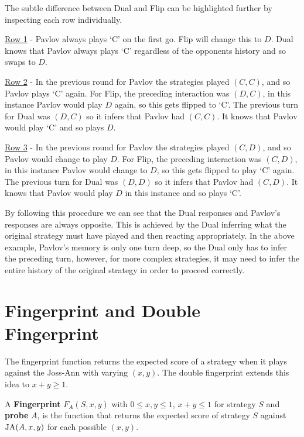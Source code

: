 The subtle difference between Dual and Flip can be highlighted further by inspecting each row individually.

\underline{Row 1} - Pavlov always plays `C' on the first go.
Flip will change this to $D$.
Dual knows that Pavlov always plays `C' regardless of the opponents history and so swaps to $D$.

\underline{Row 2} - In the previous round for Pavlov the strategies played $(C, C)$, and so Pavlov plays `C' again.
For Flip, the preceding interaction was $(D, C)$, in this instance Pavlov would play $D$ again, so this gets flipped to `C'.
The previous turn for Dual was $(D, C)$ so it infers that Pavlov had $(C, C)$.
It knows that Pavlov would play `C' and so plays $D$.

\underline{Row 3} - In the previous round for Pavlov the strategies played $(C, D)$, and so Pavlov would change to play $D$.
For Flip, the preceding interaction was $(C, D)$, in this instance Pavlov would change to $D$, so this gets flipped to play `C' again.
The previous turn for Dual was $(D, D)$ so it infers that Pavlov had $(C, D)$.
It knows that Pavlov would play $D$ in this instance and so plays `C'.

By following this procedure we can see that the Dual responses and Pavlov's responses are always opposite.
This is achieved by the Dual inferring what the original strategy must have played and then reacting appropriately.
In the above example, Pavlov's memory is only one turn deep, so the Dual only has to infer the preceding turn, however, for more complex strategies, it may need to infer the entire history of the original strategy in order to proceed correctly.

\section{Fingerprint and Double Fingerprint}
The fingerprint function returns the expected score of a strategy when it plays against the Joss-Ann with varying $(x, y)$.
The double fingerprint extends this idea to $x+y \geq 1$.

\begin{definition}\label{def:fingerprint}
A \textbf{Fingerprint} $F_A(S, x, y)$ with $0 \leq x, y \leq 1$, $x+y \leq 1$ for strategy $S$ and \textbf{probe} $A$, is the function that returns the expected score of strategy $S$ against $\text{JA}(A, x, y)$ for each possible $(x, y)$.
\end{definition}


